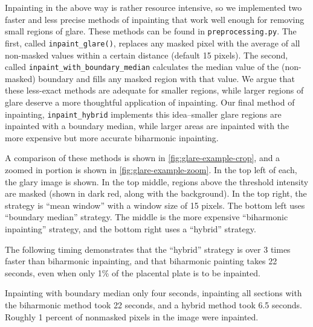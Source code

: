     Inpainting in the above way is rather resource intensive, so we implemented two faster and less precise methods of inpainting that work well enough for removing small regions of glare.
    These methods can be found in \texttt{preprocessing.py}. The first, called 
    \texttt{inpaint\_glare()}, replaces any masked pixel with the average of all non-masked values within a certain distance (default 15 pixels). The second, called \texttt{inpaint\_with\_boundary\_median} calculates the median value of the  (non-masked) boundary and fills any masked region with that value. We argue that these less-exact methods are adequate for smaller regions, while larger regions of glare deserve a more thoughtful application of inpainting. Our final method of inpainting, \texttt{inpaint\_hybrid} implements this idea--smaller glare regions are inpainted with a boundary median, while larger areas are inpainted with the more expensive but more accurate biharmonic inpainting.
    
    A comparison of these methods is shown in \cref{fig:glare-example-crop},
    and a zoomed in portion is shown in \cref{fig:glare-example-zoom}.
    In the top left of each, the glary image is shown.  In the top middle,
    regions above the threshold intensity are masked (shown in dark red, along with the background). In the top right, the strategy is ``mean window'' with a window size of 15 pixels. The bottom left uses ``boundary median'' strategy. The middle is the more expensive ``biharmonic inpainting'' strategy, and the bottom right uses a ``hybrid'' strategy.
    
    The following timing demonstrates that the ``hybrid'' strategy is over 3 times faster than biharmonic inpainting, and that biharmonic painting takes 22 seconds, even when only 1\% of the placental plate is to be inpainted.
    
    Inpainting with boundary median only four seconds, inpainting all sections with the biharmonic method took 22 seconds, and a hybrid method took 6.5 seconds. Roughly 1 percent of nonmasked pixels in the image were inpainted.

%    
%    
%    

